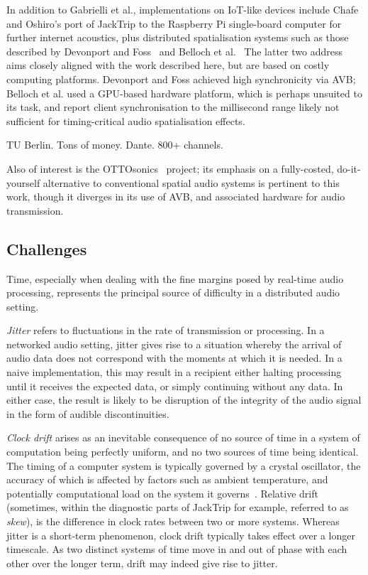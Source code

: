 In addition to Gabrielli et al., implementations on IoT-like devices include
Chafe and Oshiro's port of JackTrip to the Raspberry Pi single-board computer
for further internet acoustics, plus distributed spatialisation systems such as
those described by Devonport and Foss~\citep{devonport_distribution_2019} and
Belloch et al.~\citep{belloch_performance_2021}
The latter two address aims closely aligned with the work described here, but
are based on costly computing platforms.
Devonport and Foss achieved high synchronicity via AVB; Belloch et al. used a
GPU-based hardware platform, which is perhaps unsuited to its task, and report
client synchronisation to the millisecond range \textemdash{} likely not
sufficient for timing-critical audio spatialisation effects.

TU Berlin.
Tons of money.
Dante.
800+ channels.

Also of interest is the OTTOsonics~\citep{mitterhuber_ottosonics_2022}
project;
its emphasis on a fully-costed, do-it-yourself alternative to conventional
spatial audio systems is pertinent to this work, though it diverges in its use
of AVB, and associated hardware for audio transmission.

\subsection{Challenges}\label{subsec:challenges}

Time, especially when dealing with the fine margins posed by real-time audio
processing, represents the principal source of difficulty in a distributed
audio setting.

\textit{Jitter} refers to fluctuations in the rate of transmission or
processing.
In a networked audio setting, jitter gives rise to a situation whereby the
arrival of audio data does not correspond with the moments at which it is
needed.
In a naive implementation, this may result in a recipient either halting
processing until it receives the expected data, or simply continuing without
any data.
In either case, the result is likely to be disruption of the integrity of the
audio signal in the form of audible discontinuities.

\textit{Clock drift} arises as an inevitable consequence of no source of time
in a system of computation being perfectly uniform, and no two sources of time
being identical.
The timing of a computer system is typically governed by a crystal oscillator,
the accuracy of which is affected by factors such as ambient temperature, and
potentially computational load on the system it
governs~\citep{marouani_internal_2008}.
Relative drift (sometimes, within the diagnostic parts of JackTrip for example,
referred to as \textit{skew}), is the difference in clock rates between two or
more systems.
Whereas jitter is a short-term phenomenon, clock drift typically takes effect
over a longer timescale.
As two distinct systems of time move in and out of phase with each other over
the longer term, drift may indeed give rise to jitter.


